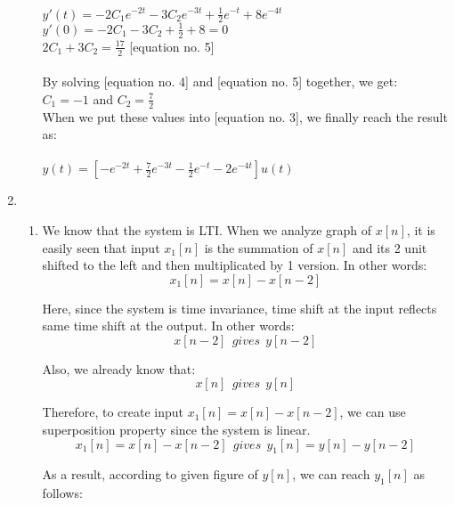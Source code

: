\documentclass[10pt,a4paper, margin=1in]{article}
\begin{document}
\begin{enumerate}
\begin{enumerate}
    $y'(t) = -2C_1 e^{-2 t} -3C_2 e^{-3 t} + \frac{1}{2}e^{-t} +8 e^{-4t}$ \\
    $y'(0) = -2C_1 -3C_2 + \frac{1}{2} +8 = 0$ \\
    $2C_1 + 3C_2 = \frac{17}{2}$ [equation no. 5] \\
    \\
    By solving [equation no. 4] and [equation no. 5] together, we get: \\
    $C_1 = -1$ and $C_2 = \frac{7}{2}$ \\
    When we put these values into [equation no. 3], we finally reach the result as: \\
    \\
    $y(t) = [- e^{-2 t} + \frac{7}{2} e^{-3 t} - \frac{1}{2}e^{-t} -2 e^{-4t}]u(t) $
    
    
    
    \end{enumerate}

\item %
    \begin{enumerate}
    \item %
    We know that the system is LTI. When we analyze graph of $x[n]$, it is easily seen that input $x_1[n]$ is the summation of $x[n]$ and its 2 unit shifted to the left and then multiplicated by 1 version. In other words: \\
     \[ x_1[n] = x[n] - x[n-2] \]
     
     Here, since the system is time invariance, time shift at the input reflects same time shift at the output. In other words: \\
     \[ x[n-2] \ \ gives \ \ y[n-2] \]
     
     Also, we already know that: \\
     \[ x[n] \ \ gives \ \ y[n] \]
     
     Therefore, to create input $x_1[n] = x[n] - x[n-2]$, we can use superposition property since the system is linear. \\
     \[ x_1[n] = x[n] - x[n-2] \ \ gives \ \ y_1[n] = y[n] - y[n-2] \]
     
     As a result, according to given figure of $y[n]$, we can reach $y_1[n]$ as follows: \\
     

\end{enumerate}
\end{enumerate}
\end{document}
